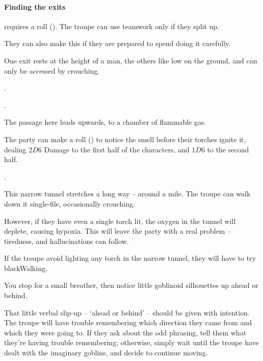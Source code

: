 \begin{multicols}{2}
\paragraph{Finding the exits}
requires a  roll (\tn[9]).
The troupe can use teamwork%
only if they split up.

They can also make this %
if they are prepared to spend  doing it carefully.

One exit rests at the height of a man, the others like low on the ground, and can only be accessed by crouching.

.

.


The passage here leads upwards, to a chamber of flammable gas.

The party can make a  roll (\tn[13]) to notice the smell before their torches ignite it, dealing $2D6$ Damage to the first half of the characters, and $1D6$ to the second half.

.


This narrow tunnel stretches a long way -- around a mile.
The troupe can walk down it single-file, occasionally crouching.

However, if they have even a single torch lit, the oxygen in the tunnel will deplete, causing \gls{hypoxia}.
This will leave the party with a real problem -- tiredness, and hallucinations can follow.

If the troupe avoid lighting any torch in the narrow tunnel, they will have to try \gls{blackWalking}.

\begin{boxtext}
  You stop for a small breather, then notice little goblinoid silhouettes up ahead or behind.
\end{boxtext}

That little verbal slip-up -- `ahead or behind' -- should be given with intention.
The troupe will have trouble remembering which direction they came from and which they were going to.
If they ask about the odd phrasing, tell them what they're having trouble remembering; otherwise, simply wait until the troupe have dealt with the imaginary goblins, and decide to continue moving.


\end{multicols}
